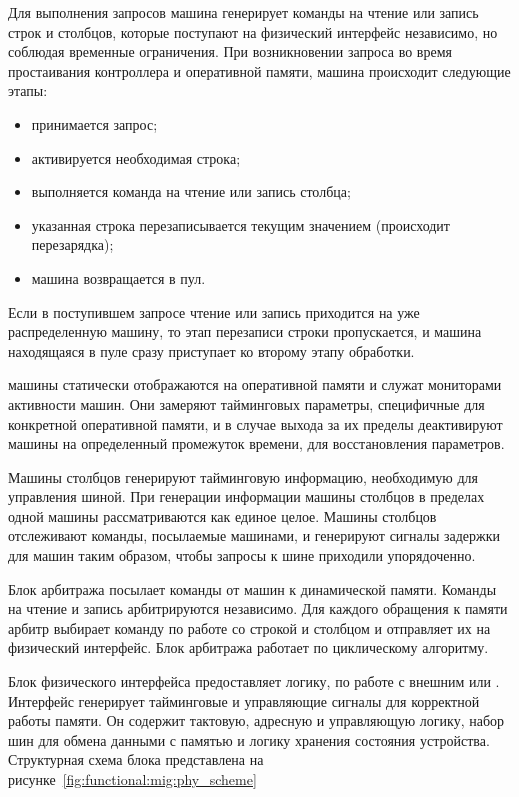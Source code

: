 Для выполнения запросов машина генерирует команды на чтение или запись строк и столбцов,
которые поступают на физический интерфейс независимо, но соблюдая временные ограничения.
При возникновении запроса во время простаивания контроллера и оперативной памяти,
 машина происходит следующие этапы:
\begin{itemize}
  \item принимается запрос;
  \item активируется необходимая строка;
  \item выполняется команда на чтение или запись столбца;
  \item указанная строка перезаписывается текущим значением (происходит перезарядка);
  \item машина возвращается в пул.
\end{itemize}

Если в поступившем запросе чтение или запись приходится на уже распределенную машину,
то этап перезаписи строки пропускается, и машина находящаяся в пуле сразу приступает
ко второму этапу обработки.

 машины статически отображаются на  оперативной памяти и служат
мониторами активности  машин. Они замеряют тайминговых параметры, специфичные
для конкретной оперативной памяти, и в случае выхода за их пределы деактивируют 
машины на определенный промежуток времени, для восстановления параметров.

Машины столбцов генерируют тайминговую информацию, необходимую для управления 
шиной. При генерации информации машины столбцов в пределах одной  машины
рассматриваются как единое целое. Машины столбцов отслеживают команды, посылаемые
 машинами, и генерируют сигналы задержки для  машин таким образом, чтобы запросы
к  шине приходили упорядоченно.

Блок арбитража посылает команды от  машин к динамической памяти. Команды на чтение и запись
арбитрируются независимо. Для каждого обращения к памяти арбитр выбирает команду по работе со строкой
и столбцом и отправляет их на физический интерфейс. Блок арбитража работает по циклическому алгоритму.

Блок физического интерфейса предоставляет логику, по работе с внешним  или .
Интерфейс генерирует тайминговые и управляющие сигналы для корректной работы памяти. Он содержит
тактовую, адресную и управляющую логику, набор шин для обмена данными с памятью и логику хранения
состояния устройства. Структурная схема блока представлена на рисунке~\ref{fig:functional:mig:phy_scheme}

